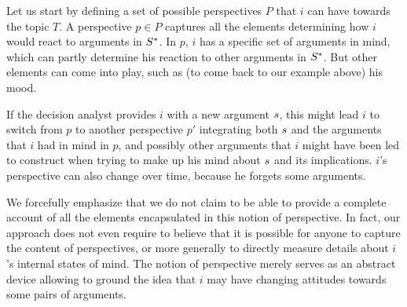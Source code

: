 \documentclass[version=3.21, pagesize, twoside=off, bibliography=totoc, DIV=calc, fontsize=12pt, a4paper]{scrartcl}
\begin{document}
Let us start by defining a set of possible perspectives $P$ that $i$ can have towards the topic $T$. A perspective $p \in P$ captures all the elements determining how $i$ would react to arguments in $S^*$. In $p$, $i$ has a specific set of arguments in mind, which can partly determine his reaction to other arguments in $S^*$. But other elements can come into play, such as (to come back to our example above) his mood. 

If the decision analyst provides $i$ with a new argument $s$, this might lead $i$ to switch from $p$ to another perspective $p'$ integrating both $s$ and the arguments that $i$ had in mind in $p$, and possibly other arguments that $i$ might have been led to construct when trying to make up his mind about $s$ and its implications. $i$'s perspective can also change over time, because he forgets some arguments.

We forcefully emphasize that we do not claim to be able to provide a complete account of all the elements encapsulated in this notion of perspective. In fact, our approach does not even require to believe that it is possible for anyone to capture the content of perspectives, or more generally to directly measure details about $i$'s internal states of mind. The notion of perspective merely serves as an abstract device allowing to ground the idea that $i$ may have changing attitudes towards some pairs of arguments.
\end{document}
